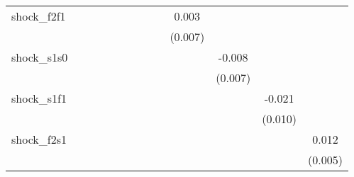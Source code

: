 {\begin{tabular}{l*{12}{c}}
\addlinespace
shock\_f2f1  &                     &                     &                     &                     &                     &                     &                     &                     &       0.003         &                     &                     &                     \\
            &                     &                     &                     &                     &                     &                     &                     &                     &     (0.007)         &                     &                     &                     \\
\addlinespace
shock\_s1s0  &                     &                     &                     &                     &                     &                     &                     &                     &                     &      -0.008         &                     &                     \\
            &                     &                     &                     &                     &                     &                     &                     &                     &                     &     (0.007)         &                     &                     \\
\addlinespace
shock\_s1f1  &                     &                     &                     &                     &                     &                     &                     &                     &                     &                     &      -0.021\sym{**} &                     \\
            &                     &                     &                     &                     &                     &                     &                     &                     &                     &                     &     (0.010)         &                     \\
\addlinespace
shock\_f2s1  &                     &                     &                     &                     &                     &                     &                     &                     &                     &                     &                     &       0.012\sym{**} \\
            &                     &                     &                     &                     &                     &                     &                     &                     &                     &                     &                     &     (0.005)         \\

\end{tabular}}
